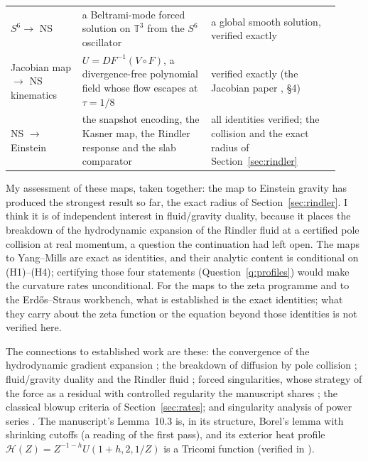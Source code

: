 \begin{center}
\begin{longtable}{@{}>{\raggedright\arraybackslash}p{0.2\linewidth}>{\raggedright\arraybackslash}p{0.36\linewidth}>{\raggedright\arraybackslash}p{0.36\linewidth}@{}}
$S^6\to$ NS & a Beltrami-mode forced solution on $\mathbb T^3$ from the $S^6$ oscillator & a global smooth solution, verified exactly\\
Jacobian map $\to$ NS kinematics & $U=DF^{-1}(V\circ F)$, a divergence-free polynomial field whose flow escapes at $\tau=1/8$ & verified exactly (the Jacobian paper \cite{JacobianPaper}, §4)\\
NS $\to$ Einstein & the snapshot encoding, the Kasner map, the Rindler response and the slab comparator & all identities verified; the collision and the exact radius of Section~\ref{sec:rindler}\\
\bottomrule
\end{longtable}
\end{center}

My assessment of these maps, taken together: the map to Einstein gravity has produced the strongest result so far, the exact radius of Section~\ref{sec:rindler}. I think it is of independent interest in fluid/gravity duality, because it places the breakdown of the hydrodynamic expansion of the Rindler fluid at a certified pole collision at real momentum, a question the continuation had left open. The maps to Yang--Mills are exact as identities, and their analytic content is conditional on (H1)--(H4); certifying those four statements (Question~\ref{q:profiles}) would make the curvature rates unconditional. For the maps to the zeta programme and to the Erdős--Straus workbench, what is established is the exact identities; what they carry about the zeta function or the equation beyond those identities is not verified here.

The connections to established work are these: the convergence of the hydrodynamic gradient expansion \cite{GKST,Withers,HSSSW}; the breakdown of diffusion by pole collision \cite{ADGS}; fluid/gravity duality and the Rindler fluid \cite{BHMR,BKLS,CMST,MarolfRangamani}; forced singularities, whose strategy of the force as a residual with controlled regularity the manuscript shares \cite{CordobaMartinezZoroa}; the classical blowup criteria of Section~\ref{sec:rates}; and singularity analysis of power series \cite{FlajoletOdlyzko}. The manuscript's Lemma~10.3 is, in its structure, Borel's lemma with shrinking cutoffs (a reading of the first pass), and its exterior heat profile $\mathcal H(Z)=Z^{-1-h}U(1+h,2,1/Z)$ is a Tricomi function (verified in ).
